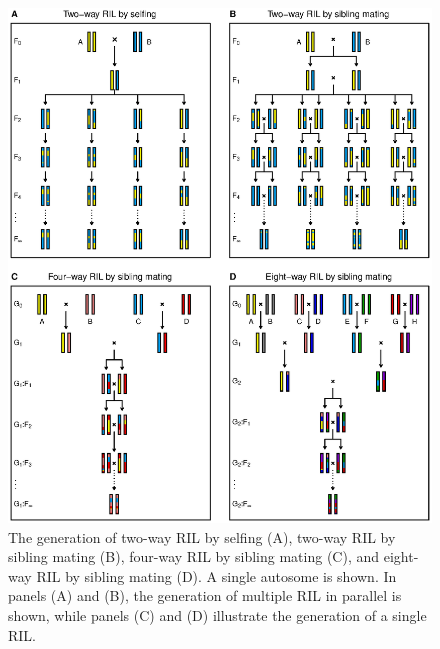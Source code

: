 \documentclass[12pt,letterpaper]{article}
\begin{document}
\begin{figure}
\centering
\includegraphics[width=\textwidth]{Figs/rifig.eps}

\bigskip
\caption{The generation of two-way RIL by selfing (A),
  two-way RIL by sibling mating (B), four-way RIL by sibling mating
  (C), and eight-way RIL by sibling mating (D).  A single autosome is
  shown.  In panels (A) and (B), the generation of multiple RIL in
  parallel is shown, while panels (C) and (D) illustrate the
  generation of a single RIL.\label{fig:rifig}}
\end{figure}

\clearpage
\end{document}
